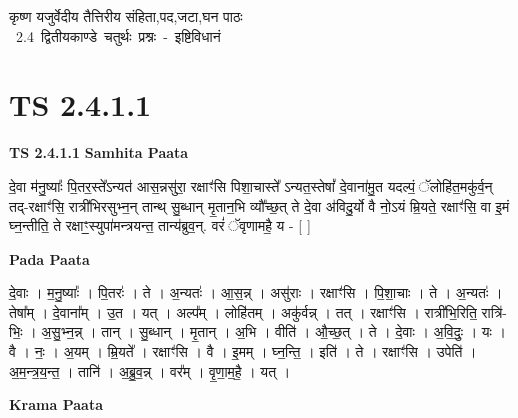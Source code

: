 \documentclass[17pt]{extarticle}
\begin{document}
\begin{titlepage}
    \begin{center}
 
\begin{sanskrit}
    { \Large
    कृष्ण यजुर्वेदीय तैत्तिरीय संहिता,पद,जटा,घन पाठः 
    }
    \\
    \vspace{2.5cm}
    \mbox{ \Large
    2.4      द्वितीयकाण्डे चतुर्थः प्रश्नः - इष्टिविधानं   }
\end{sanskrit}
\end{center}

\end{titlepage}
\tableofcontents
{}
\pagebreak


\section{ TS 2.4.1.1 }

\textbf{TS 2.4.1.1 } \newline
\textbf{Samhita Paata} \newline

दे॒वा म॑नु॒ष्याः᳚ पि॒तर॒स्ते᳚ऽन्यत॑ आस॒न्नसु॑रा॒ रक्षाꣳ॑सि पिशा॒चास्ते᳚ ऽन्यत॒स्तेषां᳚ दे॒वाना॑मु॒त यदल्पं॒ ॅलोहि॑त॒मकु॑र्व॒न् तद्-रक्षाꣳ॑सि॒ रात्री॑भिरसुभ्न॒न् तान्थ् सु॒ब्धान् मृ॒तान॒भि व्यौ᳚च्छ॒त् ते दे॒वा अ॑विदु॒र्यो वै नो॒ऽयं म्रि॒यते॒ रक्षाꣳ॑सि॒ वा इ॒मं घ्न॒न्तीति॒ ते रक्षाꣳ॒॒स्युपा॑मन्त्रयन्त॒ तान्य॑ब्रुव॒न्. वरं॑ ॅवृणामहै॒ य - [  ] \newline

\textbf{Pada Paata} \newline

दे॒वाः । म॒नु॒ष्याः᳚ । पि॒तरः॑ । ते । अ॒न्यतः॑ । आ॒स॒न्न् । असु॑राः । रक्षाꣳ॑सि । पि॒शा॒चाः । ते । अ॒न्यतः॑ । तेषा᳚म् । दे॒वाना᳚म् । उ॒त । यत् । अल्प᳚म् । लोहि॑तम् । अकु॑र्वन्न् । तत् । रक्षाꣳ॑सि । रात्री॑भि॒रिति॒ रात्रि॑-भिः॒ । अ॒सु॒भ्न॒न्न् । तान् । सु॒ब्धान् । मृ॒तान् । अ॒भि । वीति॑ । औ॒च्छ॒त् । ते । दे॒वाः । अ॒वि॒दुः॒ । यः । वै । नः॒ । अ॒यम् । म्रि॒यते᳚ । रक्षाꣳ॑सि । वै । इ॒मम् । घ्न॒न्ति॒ । इति॑ । ते । रक्षाꣳ॑सि । उपेति॑ । अ॒म॒न्त्र॒य॒न्त॒ । तानि॑ । अ॒ब्रु॒व॒न्न् । वर᳚म् । वृ॒णा॒म॒है॒ । यत् ।  \newline


\textbf{Krama Paata} \newline
\end{document}
